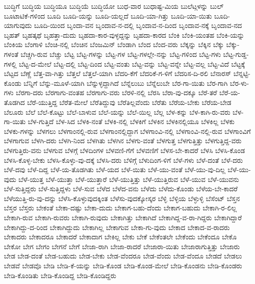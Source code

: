 {ಬುದ್ಧಿಗೆ
ಬುದ್ಧಿಯ
ಬುದ್ಧಿಯೂ
ಬುದ್ಧಿಯೆ
ಬುದ್ಧಿಯೋ
ಬುಧ-ವಾರ
ಬುಧಾಷ್ಟ-ಮಿಯ
ಬುಲೆಟ್ಗಳನ್ನು
ಬುಲ್
ಬೂಟಾಟಿಕೆ-ಗಳಿಂದ
ಬೂದಿ
ಬೂದಿ-ಯನ್ನು
ಬೂದಿ-ಯಲ್ಲದೆ
ಬೂದಿ-ಯಾ-ಗಿತ್ತು
ಬೂದಿ-ಯಾ-ಯಿತು
ಬೂದಿ-ಯಾಗುವುದು
ಬೂದಿ-ಯಿಂದ
ಬೃಂದಾ-ವನ
ಬೃಂದಾವ-ನ-ದಲ್ಲಿ
ಬೃಂದಾವ-ನ-ದಿಂದ
ಬೃಂದಾವ-ನಕ್ಕೆ
ಬೃಂದಾವ-ನದ
ಬೃಹತ್
ಬೃಹತ್ಕಥೆ
ಬೃಹತ್ತಾ-ದುದು
ಬೃಹದಾ-ಕಾರ-ವುಳ್ಳದ್ದನ್ನು
ಬೃಹದಾ-ಕಾರದ
ಬೆಂಕಿ
ಬೆಂಕಿ-ಯಂತಹ
ಬೆಂಕಿ-ಯನ್ನು
ಬೆಂಕಿಯ
ಬೆಂಗಾಳಿ
ಬೆಂಚಿ-ನಲ್ಲಿ
ಬೆಂಚಿನ
ಬೆಂಜಮಿನ್
ಬೆಂಡಾಗಿ
ಬೆಂದ
ಬೆಂದ-ವರು
ಬೆಕ್ಕನ್ನು
ಬೆಕ್ಕಿನ
ಬೆಕ್ಕು
ಬೆಕ್ಕು-ಗಳಂತೆ
ಬೆಚ್ಚಗಿ-ರುವ
ಬೆಚ್ಚು
ಬೆಟ್ಟ
ಬೆಟ್ಟ-ಗಳನ್ನು
ಬೆಟ್ಟ-ಗಳ
ಬೆಟ್ಟ-ಗಳಲ್ಲೇ-ನನ್ನು
ಬೆಟ್ಟ-ಗಳಿಂದ
ಬೆಟ್ಟ-ಗಳು
ಬೆಟ್ಟ-ಗುಡ್ಡ-ಗಳಲ್ಲಿ
ಬೆಟ್ಟ-ದ-ಮೇಲೆ
ಬೆಟ್ಟ-ದಲ್ಲಿ
ಬೆಟ್ಟ-ದಿಂದ
ಬೆಟ್ಟ-ವಂತು
ಬೆಟ್ಟ-ವನ್ನು
ಬೆಟ್ಟ-ವನ್ನೇ
ಬೆಟ್ಟ-ವಲ್ಲ
ಬೆಟ್ಟ-ವಿದೆ
ಬೆಟ್ಟಕ್ಕೆ
ಬೆಟ್ಟದ
ಬೆಣ್ಣೆ
ಬೆತ್ತ-ವಾ-ಗಿತ್ತು
ಬೆತ್ತಲೆ
ಬೆತ್ತಲೆ-ಯಾಗಿ
ಬೆದರಿ-ಕೆಗೆ
ಬೆದರಿಕೆ-ಗ-ಳಿಗೆ
ಬೆದರಿಸ-ದಿ-ರಲಿ
ಬೆನಾರಸ್
ಬೆನ್ನಟ್ಟಿ-ಕೊಂಡು
ಬೆನ್ನಿಗೆ
ಬೆನ್ನು-ಮೂಳೆ-ಯಾಗಿ
ಬೆನ್ನುಳ್ಳದ್ದಾಗಿದೆ
ಬೆನ್ನೆಲುಬು
ಬೆನ್ನೆಲುಬೇ
ಬೆರ-ಗಾ-ಯಿತು
ಬೆರ-ಗಾಗಿ
ಬೆರ-ಳು-ಗಳು
ಬೆರಗಾ-ದರು
ಬೆರಗಾಗು-ವಂತಹ
ಬೆರಗಾಗು-ವರು
ಬೆರಳಿ-ನಲ್ಲಿ
ಬೆರಸಿ
ಬೆರಾ-ವು-ದಕ್ಕೂ
ಬೆರೆ-ತರೆ
ಬೆರೆ-ಯ-ತೊಡಗಿದ
ಬೆರೆ-ಯುತ್ತಿದ್ದ
ಬೆರೆತ-ಮೇಲೆ
ಬೆರೆತಿದ್ದುವು
ಬೆರೆತಿಲ್ಲವೆಂದು
ಬೆರೆತು
ಬೆರೆಯ-ಬೇಕು
ಬೆರೆಯ-ಬೇಡ
ಬೆಲೂರು
ಬೆಲೆ
ಬೆಲೆ-ಕೊಟ್ಟು
ಬೆಲೆ-ಬಾಳುವ
ಬೆಲೆ-ಯನ್ನು
ಬೆಲೆ-ಯಿಲ್ಲ
ಬೆಲ್ಲ
ಬೆಳ-ಕನ್ನು
ಬೆಳ-ಕಾಗಿ-ರು-ವರು
ಬೆಳ-ಗಾ-ಯಿತು
ಬೆಳ-ಗುತ್ತಿದೆ
ಬೆಳ-ಸಿದ
ಬೆಳಕಿ-ನಂತೆ
ಬೆಳಕಿ-ನಲ್ಲಿ
ಬೆಳಕಿಗೆ
ಬೆಳಕಿನ
ಬೆಳಕಿನಲ್ಲಿಯೂ
ಬೆಳಕಿಲ್ಲ
ಬೆಳಕು
ಬೆಳಕು-ಗಳನ್ನು
ಬೆಳಗಲು
ಬೆಳಗಾಂನಲ್ಲಿ-ರುವ
ಬೆಳಗಾಂನಲ್ಲಿದ್ದಾಗ
ಬೆಳಗಾಂವಿ-ನಲ್ಲಿ
ಬೆಳಗಾಂವಿ-ನಲ್ಲಿ-ರುವ
ಬೆಳಗಾಂವಿಗೆ
ಬೆಳಗಾಗುವ
ಬೆಳಗಿ-ದರು
ಬೆಳಗಿ-ನಿಂದ
ಬೆಳಗಿತು
ಬೆಳಗಿನ
ಬೆಳಗು-ವಂತೆ
ಬೆಳಗುತ್ತ
ಬೆಳಗುತ್ತಿತ್ತು
ಬೆಳಗುತ್ತಿದ್ದ-ವರು
ಬೆಳಗುತ್ತಿರು-ವನು
ಬೆಳಗುವ
ಬೆಳಗ್ಗೆ
ಬೆಳದಿಂಗಳ
ಬೆಳವಣಿ-ಗೆಗೆ
ಬೆಳವಣಿಗೆ
ಬೆಳಸ-ಬೇ-ಕಾದರೆ
ಬೆಳಸಿ
ಬೆಳಸಿ-ಕೊಂಡ
ಬೆಳಸಿ-ಕೊಳ್ಳ-ಬೇಕು
ಬೆಳಸಿ-ಕೊಳ್ಳು-ವು-ದಕ್ಕೆ
ಬೆಳಸಿ-ದರು
ಬೆಳಿಗ್ಗೆ
ಬೆಳುದಿಂಗ-ಳಿಗೆ
ಬೆಳೆ-ಗಳು
ಬೆಳೆ-ದಂತೆ
ಬೆಳೆ-ದರು
ಬೆಳೆ-ದವು
ಬೆಳೆ-ದಿದ್ದ
ಬೆಳೆ-ಯ-ತೊಡಗಿತು
ಬೆಳೆ-ಯದ
ಬೆಳೆ-ಯಿತು
ಬೆಳೆ-ಯು-ವಂತೆ
ಬೆಳೆ-ಯು-ವು-ದಿಲ್ಲ
ಬೆಳೆ-ಯು-ವುದು
ಬೆಳೆ-ಯುತ್ತ
ಬೆಳೆ-ಯುತ್ತಾ
ಬೆಳೆ-ಯುತ್ತಾರೆ
ಬೆಳೆ-ಯುತ್ತಿತ್ತು
ಬೆಳೆ-ಯುತ್ತಿರುವ
ಬೆಳೆ-ಯುವ
ಬೆಳೆ-ಯುವನು
ಬೆಳೆ-ಸುತ್ತಿದ್ದರು
ಬೆಳೆ-ಸುತ್ತಿದ್ದಳು
ಬೆಳೆ-ಸುವ
ಬೆಳೆದ
ಬೆಳೆದ-ವನು
ಬೆಳೆದು
ಬೆಳೆದು-ಕೊಂಡು
ಬೆಳೆಯ-ಬೇ-ಕಾದರೆ
ಬೆಳೆಯುತ್ತಿ-ರು-ವು-ದನ್ನು
ಬೆಳೆಸಿ-ಕೊಳ್ಳುವುದಕ್ಕಿಂತ
ಬೆಳೆಸು-ವುದಕ್ಕೋಸ್ಕರ
ಬೆಳ್ಳಿ
ಬೆಳ್ಳಿಯ
ಬೆಳ್ಳುಳ್ಳಿ
ಬೆಸೆಂಟ್
ಬೆಸ್ತನ
ಬೆಸ್ತರ
ಬೆಸ್ತರು
ಬೇಕಂತೆ
ಬೇಕಾ-ದಷ್ಟು
ಬೇಕಾ-ದುದು
ಬೇಕಾಗ-ಬಹು-ದೆಂದು
ಬೇಕಾಗ-ಬಹುದು
ಬೇಕಾಗಿ-ರ-ಲಿಲ್ಲ
ಬೇಕಾಗಿ-ರುವ
ಬೇಕಾಗಿ-ರುವರು
ಬೇಕಾಗಿ-ರುವುದು
ಬೇಕಾಗಿತ್ತು
ಬೇಕಾಗಿದೆ
ಬೇಕಾಗಿದ್ದ-ವ-ರಾ-ಗಿದ್ದರು
ಬೇಕಾಗಿದ್ದಾರೆ
ಬೇಕಾಗಿದ್ದು-ದ-ರಿಂದ
ಬೇಕಾಗಿದ್ದುದು
ಬೇಕಾಗಿಲ್ಲ
ಬೇಕಾಗುವ
ಬೇಕಾ-ಗು-ವುದು
ಬೇಕಾದ
ಬೇಕಾದ-ವ-ರಾದರು
ಬೇಕಾದರು
ಬೇಕಾದರೂ
ಬೇಕಾದರೆ
ಬೇಕಾದಾಗ
ಬೇಕಿಲ್ಲ
ಬೇಕು
ಬೇಕೆ
ಬೇಕೆಂತಲೇ
ಬೇಕೆಂದು
ಬೇಕೆಂದೂ
ಬೇಕೊ
ಬೇಕೋ
ಬೇಗ
ಬೇಗಂ
ಬೇಗನೆ
ಬೇಗೆ
ಬೇಜಾ-ರಾಗಿ
ಬೇಜಾ-ರಾದರೆ
ಬೇಜಾರಾ-ಯಿತು
ಬೇಜಾರಾಗುತ್ತಿತ್ತು
ಬೇಜಾರು
ಬೇಡ
ಬೇಡ-ದಂತೆ
ಬೇಡ-ಬಹುದು
ಬೇಡ-ಬೇಕು
ಬೇಡ-ವೆಂದರೂ
ಬೇಡ-ವೆಂದು
ಬೇಡ-ವೆಂದೂ
ಬೇಡದೆ
ಬೇಡಲು
ಬೇಡವೆ
ಬೇಡವೊ
ಬೇಡಿ
ಬೇಡಿ-ಕೆ-ಯನ್ನು
ಬೇಡಿ-ಕೊಂಡ
ಬೇಡಿ-ಕೊಂಡ-ಮೇಲೆ
ಬೇಡಿ-ಕೊಂಡನು
ಬೇಡಿ-ಕೊಂಡರು
ಬೇಡಿ-ಕೊಂಡಿತು
ಬೇಡಿ-ಕೊಂಡಿದ್ದ
ಬೇಡಿ-ಕೊಂಡಿದ್ದರು
}
